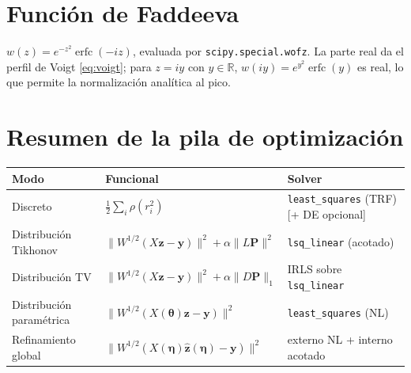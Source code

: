 \documentclass[11pt,a4paper]{article}
\newcommand{\code}[1]{\texttt{\small #1}}
\DeclareMathOperator{\erfc}{erfc}
\begin{document}
\section{Función de Faddeeva}
$w(z)=e^{-z^2}\erfc(-iz)$, evaluada por \code{scipy.special.wofz}. La parte real
da el perfil de Voigt \eqref{eq:voigt}; para $z=iy$ con $y\in\mathbb R$,
$w(iy)=e^{y^2}\erfc(y)$ es real, lo que permite la normalización analítica al pico.

\section{Resumen de la pila de optimización}
\begin{center}
\begin{tabular}{@{}lll@{}}
\toprule
\textbf{Modo} & \textbf{Funcional} & \textbf{Solver}\\
\midrule
Discreto & $\tfrac12\sum_i\rho(r_i^2)$ & \code{least\_squares} (TRF) [+ DE opcional]\\
Distribución Tikhonov & $\|W^{1/2}(X\bm z-\bm y)\|^2+\alpha\|L\bm P\|^2$ & \code{lsq\_linear} (acotado)\\
Distribución TV & $\|W^{1/2}(X\bm z-\bm y)\|^2+\alpha\|D\bm P\|_1$ & IRLS sobre \code{lsq\_linear}\\
Distribución paramétrica & $\|W^{1/2}(X(\bm\theta)\bm z-\bm y)\|^2$ & \code{least\_squares} (NL)\\
Refinamiento global & $\|W^{1/2}(X(\bm\eta)\hat{\bm z}(\bm\eta)-\bm y)\|^2$ & externo NL + interno acotado\\
\bottomrule
\end{tabular}
\end{center}
\end{document}

